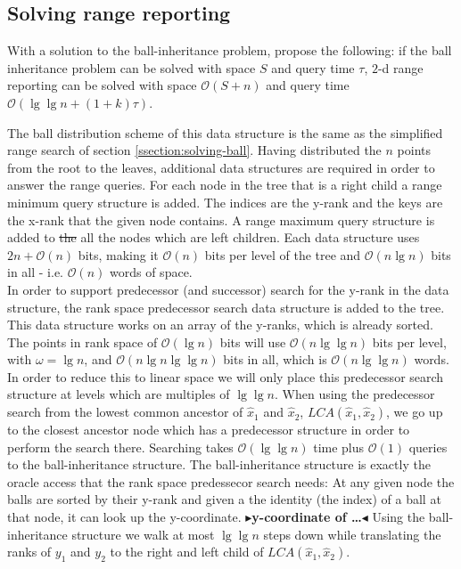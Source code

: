 \documentclass[twoside,11pt,openright]{report}
\newcommand{\todo}[1]{{\color[rgb]{.5,0,0}\textbf{$\blacktriangleright$#1$\blacktriangleleft$}}}
\newenvironment{customlem}[1]
  {\renewcommand\theinnercustomlem{#1}\innercustomlem}
  {\endinnercustomlem}
\providecommand{\DIFdel}[1]{{\protect\color{red}\sout{#1}}}                      %
\providecommand{\DIFdelbegin}{} %
\providecommand{\DIFdelend}{} %
\begin{document}
\subsection{Solving range reporting}

With a solution to the ball-inheritance problem, \citet{chanetal} propose the following: 
\begin{customlem}{2.4}\label{lemma24}
if the ball inheritance problem can be solved with space $S$ and query time $\tau$, $2$-d range reporting can be solved with space $\mathcal{O}(S+n)$ and query time $\mathcal{O}(\lg \lg n + (1+k) \tau)$.
\end{customlem}


The ball distribution scheme of this data structure is the same as the simplified range search of section \ref{ssection:solving-ball}. Having distributed the $n$ points from the root to the leaves, additional data structures are required in order to answer the range queries. For each node in the tree that is a right child a range minimum query structure is added. The indices are the y-rank and the keys are the x-rank that the given node contains. A range maximum query structure is added to \DIFdelbegin \DIFdel{the }\DIFdelend all the nodes which are left children. Each data structure uses $2n + \mathcal{O}(n)$ bits, making it $\mathcal{O}(n)$ bits per level of the tree and $\mathcal{O}(n \lg n)$ bits in all - i.e. $\mathcal{O}(n)$ words of space. \\

In order to support predecessor (and successor) search for the y-rank in the data structure, the rank space predecessor search data structure is added to the tree. This data structure works on an array of the y-ranks, which is already sorted. The points in rank space of $\mathcal{O}(\lg n)$ bits will use $\mathcal{O}(n \lg \lg n)$ bits per level, with $\omega = \lg n$, and $\mathcal{O}(n \lg n \lg \lg n)$ bits in all, which is $\mathcal{O}(n \lg \lg n)$ words. In order to reduce this to linear space we will only place this predecessor search structure at levels which are multiples of $\lg \lg n$. When using the predecessor search from the lowest common ancestor of $\hat{x}_1$ and $\hat{x}_2$, $LCA(\hat{x}_1, \hat{x}_2)$, we go up to the closest ancestor node which has a predecessor structure in order to perform the search there. Searching takes $\mathcal{O}(\lg \lg n)$ time plus $\mathcal{O}(1)$ queries to the ball-inheritance structure. The ball-inheritance structure is exactly the oracle access that the rank space predessecor search needs: At any given node the balls are sorted by their y-rank and given a the identity (the index) of a ball at that node, it can look up the y-coordinate. \todo{y-coordinate of \ldots} Using the ball-inheritance structure we walk at most $\lg \lg n$ steps down while translating the ranks of $y_1$ and $y_2$ to the right and left child of $LCA(\hat{x}_1, \hat{x}_2)$. 
\end{document}
